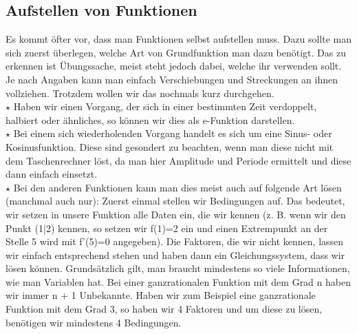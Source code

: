 \subsection{Aufstellen von Funktionen}
Es kommt öfter vor, dass man Funktionen selbst aufstellen muss. Dazu sollte man sich zuerst überlegen, welche Art von Grundfunktion man dazu benötigt. Das zu erkennen ist Übungssache, meist steht jedoch dabei, welche ihr verwenden sollt. Je nach Angaben kann man einfach Verschiebungen und Streckungen an ihnen vollziehen. Trotzdem wollen wir das nochmals kurz durchgehen.\\
\(\star\) Haben wir einen Vorgang, der sich in einer bestimmten Zeit verdoppelt, halbiert oder ähnliches, so können wir dies als e-Funktion darstellen.\\
\(\star\) Bei einem sich wiederholenden Vorgang handelt es sich um eine Sinus- oder Kosinusfunktion. Diese sind gesondert zu beachten, wenn man diese nicht mit dem Taschenrechner löst, da man hier Amplitude und Periode ermittelt und diese dann einfach einsetzt.\\
\(\star\) Bei den anderen Funktionen kann man dies meist auch auf folgende Art lösen (manchmal auch nur): Zuerst einmal stellen wir Bedingungen auf. Das bedeutet, wir setzen in unsere Funktion alle Daten ein, die wir kennen (z. B. wenn wir den Punkt (1|2) kennen, so setzen wir f(1)=2 ein und einen Extrempunkt an der Stelle 5 wird mit f'(5)=0 angegeben). Die Faktoren, die wir nicht kennen, lassen wir einfach entsprechend stehen und haben dann ein Gleichungssystem, dass wir lösen können. Grundsätzlich gilt, man braucht mindestens so viele Informationen, wie man Variablen hat. Bei einer ganzrationalen Funktion mit dem Grad n haben wir immer n + 1 Unbekannte. Haben wir zum Beispiel eine ganzrationale Funktion mit dem Grad 3, so haben wir 4 Faktoren und um diese zu lösen, benötigen wir mindestens 4 Bedingungen.

